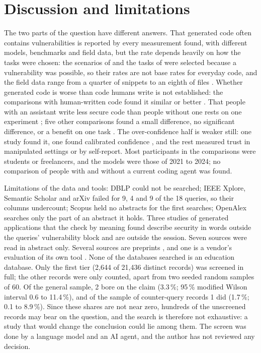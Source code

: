 \section{Discussion and limitations}
\label{insecure-code:discussion}

The two parts of the question have different answers.
That generated code often contains vulnerabilities is reported by every
measurement found, with different models, benchmarks and field data, but
the rate depends heavily on how the tasks were chosen: the scenarios of
\textcite{Pearce2022Asleep} and the tasks of \textcite{Zhao2026VibeCoding}
were selected because a vulnerability was possible, so their rates are not
base rates for everyday code, and the field data range from a quarter of
snippets \autocite{Fu2025Weaknesses} to an eighth of files
\autocite{Schreiber2025GitHub}.
Whether generated code is worse than code humans write is not established:
the comparisons with human-written code found it similar or better
\autocite{Asare2023Copilot,Hamer2024Copy,Belozerov2026Repair}.
That people with an assistant write less secure code than people without one
rests on one experiment \autocite{Perry2023Users}; five other comparisons
found a small difference, no significant difference, or a benefit on one
task \autocite{Sandoval2023LostC,Asare2024UserCentered,
ZareShahneh2025Copilot,Jost2026Gemini,Yardim2026Password}.
The over-confidence half is weaker still: one study found it, one found
calibrated confidence \autocite{Khalid2026Trust}, and the rest measured trust
in manipulated settings or by self-report.
Most participants in the comparisons were students or freelancers, and the
models were those of 2021 to 2024; no comparison of people with and without
a current coding agent was found.

Limitations of the data and tools: DBLP could not be searched; IEEE Xplore,
Semantic Scholar and arXiv failed for 9, 4 and 9 of the 18 queries, so their
columns undercount; Scopus held no abstracts for the first searches;
OpenAlex searches only the part of an abstract it holds.
Three studies of generated applications that the check by meaning found
describe security in words outside the queries' vulnerability block and are
outside the session.
Seven sources were read in abstract only.
Several sources are preprints \autocite{Jost2026Gemini,Khalid2026Trust,
SantosdeMoura2026Newer,Sun2026Propagate,Churilov2026Range,
Okwor2026Registration,Bhatt2023CyberSecEval}, and one is a vendor's
evaluation of its own tool \autocite{Blain2026Broken}.
None of the databases searched is an education database.
Only the first tier (2,644 of 21,436 distinct records) was screened in full;
the other records were only counted, apart from two seeded random samples of
60.
Of the general sample, 2 bore on the claim (3.3\,\%; 95\,\% modified Wilson
interval 0.6 to 11.4\,\%), and of the sample of counter-query records 1 did
(1.7\,\%; 0.1 to 8.9\,\%).
Since these shares are not near zero, hundreds of the unscreened records may
bear on the question, and the search is therefore not exhaustive: a study
that would change the conclusion could lie among them.
The screen was done by a language model and an AI agent, and the author has
not reviewed any decision.

